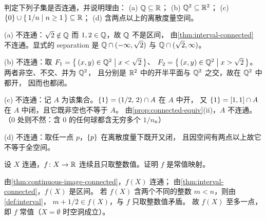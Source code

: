 \begin{exercise}[例行]
  \label{exr:decide-connected}
  判定下列子集是否连通，并说明理由：
  (a) \(\mathbb{Q} \subseteq \mathbb{R}\)；\quad
  (b) \(\mathbb{Q}^{2} \subseteq \mathbb{R}^{2}\)；\quad
  (c) \(\left\{0\right\} \cup \left\{\,1/n \;\middle|\; n \ge 1\,\right\} \subseteq \mathbb{R}\)；\quad
  (d) 含两点以上的离散度量空间。
  \begin{solution}
    (a) 不连通：\(\sqrt2 \notin \mathbb{Q}\) 而 \(1,2 \in \mathbb{Q}\)，故 \(\mathbb{Q}\) 不是区间，
    由\cref{thm:interval-connected} 不连通。显式的 separation 是
    \(\mathbb{Q} \cap (-\infty,\sqrt2)\) 与 \(\mathbb{Q} \cap (\sqrt2,\infty)\)。

    (b) 不连通：取 \(F_{1} = \left\{\,(x,y) \in \mathbb{Q}^{2} \;\middle|\; x<\sqrt2\,\right\}\)、
    \(F_{2} = \left\{\,(x,y) \in \mathbb{Q}^{2} \;\middle|\; x>\sqrt2\,\right\}\)。两者非空、不交、并为 \(\mathbb{Q}^{2}\)，
    且分别是 \(\mathbb{R}^{2}\) 中的开半平面与 \(\mathbb{Q}^{2}\) 之交，故在 \(\mathbb{Q}^{2}\) 中都开，
    因而也都闭。

    (c) 不连通：记 \(A\) 为该集合。\(\left\{1\right\} = (1/2,\,2) \cap A\) 在 \(A\) 中开，
    又 \(\left\{1\right\} = [1,1] \cap A\) 在 \(A\) 中闭，且它既非空也不等于 \(A\)。
    由\cref{prop:connected-equiv}(ii)，\(A\) 不连通。
    （\(0\) 处则不然：含 \(0\) 的任何球都含无穷多个 \(1/n\)。）

    (d) 不连通：取任一点 \(p\)，\(\left\{p\right\}\) 在离散度量下既开又闭，
    且因空间有两点以上故它不等于全空间。
  \end{solution}
\end{exercise}

\begin{exercise}[例行]
  \label{exr:integer-valued}
  设 \(X\) 连通，\(f \colon X \to \mathbb{R}\) 连续且只取整数值。证明 \(f\) 是常值映射。
  \begin{solution}
    由\cref{thm:continuous-image-connected}，\(f(X)\) 连通；
    由\cref{thm:interval-connected}，\(f(X)\) 是区间。
    若 \(f(X)\) 含两个不同的整数 \(m<n\)，则由\cref{def:interval}，
    \(m + 1/2 \in f(X)\)，与 \(f\) 只取整数值矛盾。
    故 \(f(X)\) 至多一点，即 \(f\) 常值（\(X=\emptyset\) 时空洞成立）。
  \end{solution}
\end{exercise}

